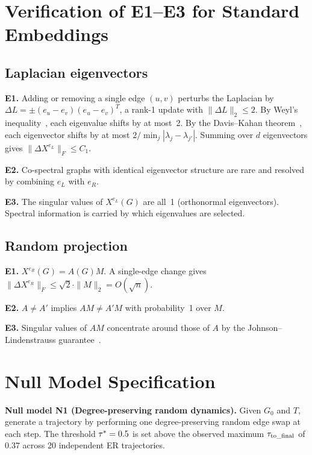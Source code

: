 \documentclass{../shared/primo}
\begin{document}
\appendix

\section{Verification of E1--E3 for Standard Embeddings}
\label{app:regularity}

\subsection{Laplacian eigenvectors}

\textbf{E1.} Adding or removing a single edge $(u,v)$ perturbs the Laplacian by $\Delta L = \pm(e_u - e_v)(e_u - e_v)^T$, a rank-1 update with $\|\Delta L\|_2 \leq 2$. By Weyl's inequality~\cite{weyl1912asymptotische}, each eigenvalue shifts by at most~2. By the Davis--Kahan theorem~\cite{davis1970rotation}, each eigenvector shifts by at most $2/\min_j |\lambda_j - \lambda_{j'}|$. Summing over $d$ eigenvectors gives $\|\Delta X^{e_L}\|_F \leq C_1$.

\textbf{E2.} Co-spectral graphs with identical eigenvector structure are rare and resolved by combining $e_L$ with $e_R$.

\textbf{E3.} The singular values of $X^{e_L}(G)$ are all~1 (orthonormal eigenvectors). Spectral information is carried by which eigenvalues are selected.

\subsection{Random projection}

\textbf{E1.} $X^{e_R}(G) = A(G)M$. A single-edge change gives $\|\Delta X^{e_R}\|_F \leq \sqrt{2} \cdot \|M\|_2 = O(\sqrt{n})$.

\textbf{E2.} $A \neq A'$ implies $AM \neq A'M$ with probability~1 over $M$.

\textbf{E3.} Singular values of $AM$ concentrate around those of $A$ by the Johnson--Lindenstrauss guarantee~\cite{johnson1984extensions}.

\section{Null Model Specification}
\label{app:null}

\textbf{Null model N1 (Degree-preserving random dynamics).} Given $G_0$ and $T$, generate a trajectory by performing one degree-preserving random edge swap at each step. The threshold $\tau^* = 0.5$ is set above the observed maximum $\tau_{\mathrm{to\_final}}$ of $0.37$ across 20 independent ER trajectories.
\end{document}

